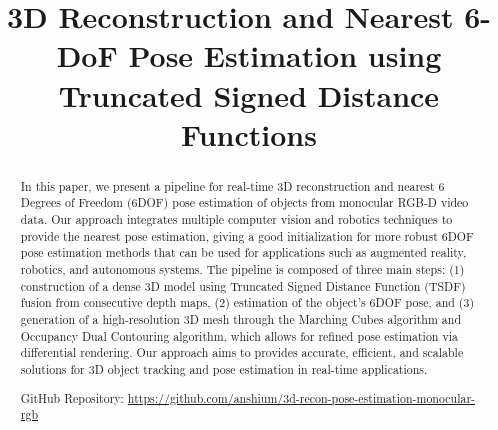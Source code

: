 \documentclass[conference]{IEEEtran}
\begin{document}
\title{3D Reconstruction and Nearest 6-DoF Pose Estimation using Truncated Signed Distance Functions\\}

\author{
\and
{}
\and

}

\maketitle

\begin{abstract}
In this paper, we present a pipeline for real-time 3D reconstruction and nearest 6 Degrees of Freedom (6DOF) pose estimation of objects from monocular RGB-D video data. Our approach integrates multiple computer vision and robotics techniques to provide the nearest pose estimation, giving a good initialization for more robust 6DOF pose estimation methods that can be used for applications such as augmented reality, robotics, and autonomous systems. The pipeline is composed of three main steps: (1) construction of a dense 3D model using Truncated Signed Distance Function (TSDF) fusion from consecutive depth maps, (2) estimation of the object’s 6DOF pose, and (3) generation of a high-resolution 3D mesh through the Marching Cubes algorithm and Occupancy Dual Contouring algorithm, which allows for refined pose estimation via differential rendering. Our approach aims to provides accurate, efficient, and scalable solutions for 3D object tracking and pose estimation in real-time applications.

GitHub Repository: \href{https://github.com/anshium/3d-recon-pose-estimation-monocular-rgb}{https://github.com/anshium/3d-recon-pose-estimation-monocular-rgb}
\end{abstract}
\end{document}
